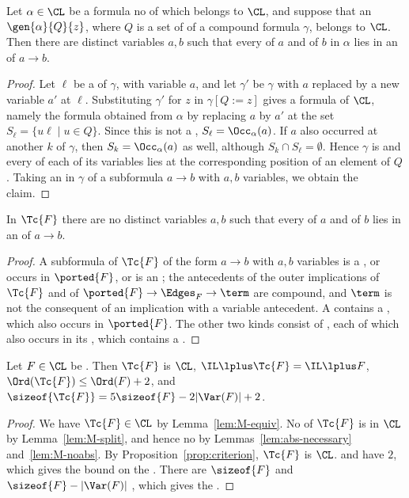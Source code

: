 \begin{lemma}\label{lem:abs-necessary}
Let $\alpha\in\CL$ be a formula no  of which belongs to
$\CL$, and suppose that an  $\gen{\alpha}{Q}{z}$, where $Q$
is a set of  of a compound formula $\gamma$, belongs to
$\CL$. Then there are distinct variables $a,b$ such that every
 of $a$ and of $b$ in $\alpha$ lies in an  of
$a\to b$.
\end{lemma}
\begin{proof}
Let $\ell$ be a  of $\gamma$, with variable $a$, and let $\gamma'$
be $\gamma$ with $a$ replaced by a new variable $a'$ at $\ell$. Substituting
$\gamma'$ for $z$ in $\gamma[Q:=z]$ gives a formula of $\CL$, namely the
formula obtained from $\alpha$ by replacing $a$ by $a'$ at the set
$S_\ell=\{u\ell\mid u\in Q\}$. Since this is not a ,
$S_\ell=\Occ_\alpha(a)$. If $a$ also occurred at another  $k$ of
$\gamma$, then $S_k=\Occ_\alpha(a)$ as well, although $S_k\cap
S_\ell=\emptyset$. Hence $\gamma$ is  and every
 of each of its variables lies at the corresponding position
of an element of $Q$. Taking an  in $\gamma$ of a
subformula $a\to b$ with $a,b$ variables, we obtain the claim.
\end{proof}

\begin{lemma}\label{lem:M-noabs}
In $\Tc{F}$ there are no distinct variables $a,b$ such that every
 of $a$ and of $b$ lies in an  of $a\to b$.
\end{lemma}
\begin{proof}
A subformula of $\Tc{F}$ of the form $a\to b$ with $a,b$ variables is a
, or occurs in $\ported{F}$, or is an ; the
antecedents of the outer implications of $\Tc{F}$ and of
$\ported{F}\to\Edges_F\to\term$ are compound, and $\term$ is not the
consequent of an implication with a variable antecedent. A 
contains a , which also occurs in $\ported{F}$. The other two
kinds consist of , each of which also occurs in its ,
which contains a .
\end{proof}

\begin{theorem}\label{thm:closure}
Let $F\in\CL$ be . Then $\Tc{F}$ is 
$\CL$, $\IL\lplus\Tc{F}=\IL\lplus F$, $\Ord(\Tc{F})\le\Ord(F)+2$, and
$\sizeof{\Tc{F}}=5\sizeof{F}-2|\Var(F)|+2$.
\end{theorem}
\begin{proof}
We have $\Tc{F}\in\CL$ by Lemma~\ref{lem:M-equiv}. No  of
$\Tc{F}$ is in $\CL$ by Lemma~\ref{lem:M-split}, and hence no
 by Lemmas~\ref{lem:abs-necessary} and~\ref{lem:M-noabs}.
By Proposition~\ref{prop:criterion}, $\Tc{F}$ is  $\CL$.
 and  have  $2$, which gives the
bound on the . There are $\sizeof{F}$  and
$\sizeof{F}-|\Var(F)|$ , which gives the .
\end{proof}


